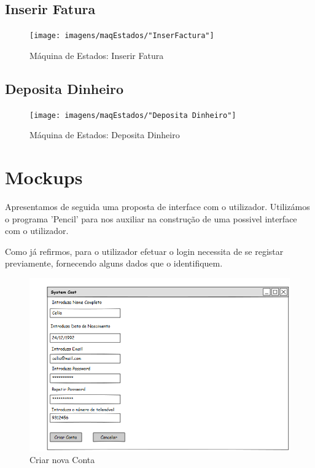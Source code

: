 \newpage

\subsection{Inserir Fatura}
\begin{figure}[htb!]
	\centering
	\texttt{[image: imagens/maqEstados/"InserFactura"]}  
	\caption{Máquina de Estados: Inserir Fatura}  
\end{figure}

\subsection{Deposita Dinheiro}
\begin{figure}[htb!]
	\centering
	\texttt{[image: imagens/maqEstados/"Deposita Dinheiro"]}  
	\caption{Máquina de Estados: Deposita Dinheiro}  
\end{figure}

\newpage
\section{Mockups}
Apresentamos de seguida uma proposta de interface com o utilizador. Utilizámos o programa 'Pencil' para nos auxiliar na construção de uma possivel interface com o utilizador. 


Como já refirmos, para o utilizador efetuar o login necessita de se registar previamente, fornecendo alguns dados que o identifiquem. 
\begin{figure}[htb!]
	\centering
	\includegraphics[scale=0.5]{imagens/mockups/CriarConta}  
	\caption{Criar nova Conta }  
\end{figure}

